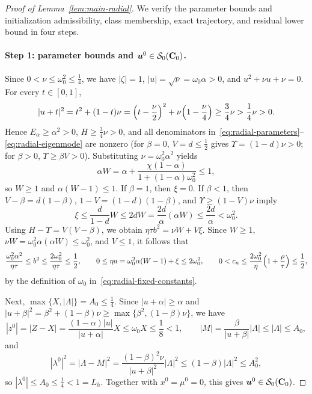 \begin{proof}[Proof of Lemma~\ref{lem:main-radial}]
We verify the parameter bounds and initialization admissibility, class
membership, exact trajectory, and residual lower bound in four steps.

\paragraph{Step 1: parameter bounds and \(\bm{u}^0\in\mathcal S_0(\mathbf C_0)\).}
Since \(0<\nu\le\omega_0^2\le\frac14\), we have \(|\zeta|=1\),
\(|u|=\sqrt{\nu}=\omega_0\alpha>0\), and \(u^2+\nu u+\nu=0\).
For every \(t\in[0,1]\),
\[
|u+t|^2=t^2+(1-t)\nu=\Bigl(t-\frac{\nu}{2}\Bigr)^2+\nu\Bigl(1-\frac{\nu}{4}\Bigr)
\ge\frac34\nu>\frac14\nu>0.
\]
Hence \(E_\alpha\ge\alpha^2>0\), \(H\ge\frac34\nu>0\), and all denominators
in~\eqref{eq:radial-parameters}--\eqref{eq:radial-eigenmode} are nonzero
(for \(\beta=0\), \(V=d\le\frac12\) gives \(\Upsilon=(1-d)\nu>0\); for
\(\beta>0\), \(\Upsilon\ge\beta V>0\)).
Substituting \(\nu=\omega_0^2\alpha^2\) yields
\[
\alpha W=\alpha+\frac{\chi(1-\alpha)}{1+(1-\alpha)\omega_0^2}\le1,
\]
so \(W\ge1\) and \(\alpha(W-1)\le1\). If \(\beta=1\), then \(\xi=0\). If
\(\beta<1\), then \(V-\beta=d(1-\beta)\), \(1-V=(1-d)(1-\beta)\), and
\(\Upsilon\ge(1-V)\nu\) imply
\[
\xi\le\frac{d}{1-d}W\le2dW=\frac{2d}{\alpha}(\alpha W)\le\frac{2d}{\alpha}<\omega_0^2.
\]
Using \(H-\Upsilon=V(V-\beta)\), we obtain \(\eta\tau b^2=\nu W+V\xi\).
Since \(W\ge1\), \(\nu W=\omega_0^2\alpha(\alpha W)\le\omega_0^2\), and
\(V\le1\), it follows that
\[
\frac{\omega_0^2\alpha^2}{\eta\tau}\le b^2\le\frac{2\omega_0^2}{\eta\tau}\le\frac12,
\qquad
0\le\eta a=\omega_0^2\alpha(W-1)+\xi\le2\omega_0^2,
\qquad
0<c_\kappa\le\frac{2\omega_0^2}{\eta}\Bigl(1+\frac{\rho}{\tau}\Bigr)\le\frac12,
\]
by the definition of \(\omega_0\) in~\eqref{eq:radial-fixed-constants}.

Next, \(\max\{X,|\Lambda|\}=A_0\le\frac14\). Since \(|u+\alpha|\ge\alpha\) and
\(|u+\beta|^2=\beta^2+(1-\beta)\nu\ge\max\{\beta^2,(1-\beta)\nu\}\), we have
\[
|z^0|=|Z-X|=\frac{(1-\alpha)|u|}{|u+\alpha|}X\le\omega_0 X\le\frac18<1,
\qquad
|M|=\frac{\beta}{|u+\beta|}|\Lambda|\le|\Lambda|\le A_0,
\]
and
\[
|\lambda^0|^2=|\Lambda-M|^2
=\frac{(1-\beta)^2\nu}{|u+\beta|^2}|\Lambda|^2
\le(1-\beta)|\Lambda|^2\le A_0^2,
\]
so \(|\lambda^0|\le A_0\le\frac14<1=L_h\). Together with \(x^0=\mu^0=0\), this
gives \(\bm{u}^0\in\mathcal S_0(\mathbf C_0)\).


\end{proof}
